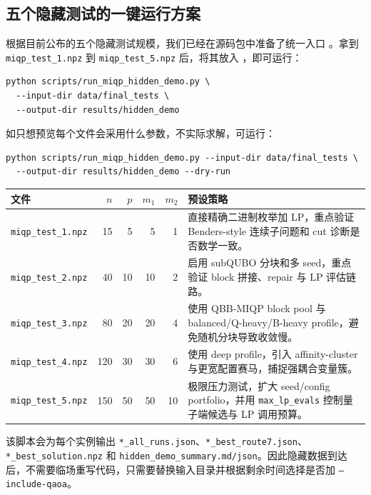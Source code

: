 \documentclass[UTF8,a4paper,11pt]{ctexart}
\begin{document}
\subsection{五个隐藏测试的一键运行方案}

根据目前公布的五个隐藏测试规模，我们已经在源码包中准备了统一入口 。拿到 \texttt{miqp\_test\_1.npz} 到 \texttt{miqp\_test\_5.npz} 后，将其放入 ，即可运行：

\begin{verbatim}
python scripts/run_miqp_hidden_demo.py \
  --input-dir data/final_tests \
  --output-dir results/hidden_demo
\end{verbatim}

如只想预览每个文件会采用什么参数，不实际求解，可运行：

\begin{verbatim}
python scripts/run_miqp_hidden_demo.py --input-dir data/final_tests \
  --output-dir results/hidden_demo --dry-run
\end{verbatim}

\begin{center}
\small
\begin{tabular}{lrrrrp{7.2cm}}
\toprule
文件 & $n$ & $p$ & $m_1$ & $m_2$ & 预设策略 \\
\midrule
\texttt{miqp\_test\_1.npz} & 15 & 5 & 5 & 1 & 直接精确二进制枚举加 LP，重点验证 Benders-style 连续子问题和 cut 诊断是否数学一致。\\
\texttt{miqp\_test\_2.npz} & 40 & 10 & 10 & 2 & 启用 subQUBO 分块和多 seed，重点验证 block 拼接、repair 与 LP 评估链路。\\
\texttt{miqp\_test\_3.npz} & 80 & 20 & 20 & 4 & 使用 QBB-MIQP block pool 与 balanced/Q-heavy/B-heavy profile，避免随机分块导致收敛慢。\\
\texttt{miqp\_test\_4.npz} & 120 & 30 & 30 & 6 & 使用 deep profile，引入 affinity-cluster 与更宽配置赛马，捕捉强耦合变量簇。\\
\texttt{miqp\_test\_5.npz} & 150 & 50 & 50 & 10 & 极限压力测试，扩大 seed/config portfolio，并用 \texttt{max\_lp\_evals} 控制量子端候选与 LP 调用预算。\\
\bottomrule
\end{tabular}
\end{center}

该脚本会为每个实例输出 \texttt{*\_all\_runs.json}、\texttt{*\_best\_route7.json}、\texttt{*\_best\_solution.npz} 和 \texttt{hidden\_demo\_summary.md/json}。因此隐藏数据到达后，不需要临场重写代码，只需要替换输入目录并根据剩余时间选择是否加 \texttt{--include-qaoa}。
\end{document}
